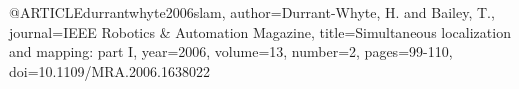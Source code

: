 @ARTICLE{durrantwhyte2006slam,
author={Durrant-Whyte, H. and Bailey, T.},
journal={IEEE Robotics \& Automation Magazine}, 
title={Simultaneous localization and mapping: part I}, 
year={2006},
volume={13},
number={2},
pages={99-110},
doi={10.1109/MRA.2006.1638022}}